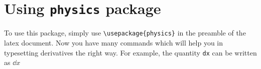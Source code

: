 \documentclass[11pt]{article}
\begin{document}
\section{Using \texttt{physics} package}
\label{sec:org7a7c725}
To use this package, simply use \texttt{\textbackslash{}usepackage\{physics\}} in the preamble of the latex document. Now you have many commands which will help you in typesetting derivatives the right way. For example, the quantity \texttt{dx} can be written as \(\dd x\)
\end{document}
